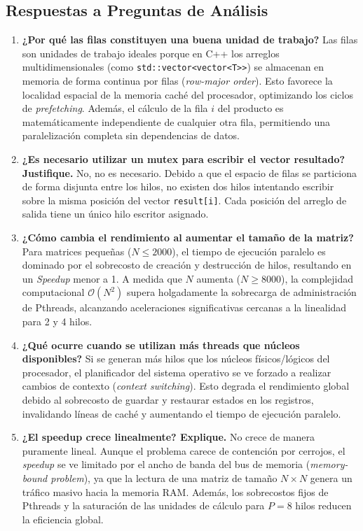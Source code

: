 \documentclass[11pt,a4paper]{article}
\begin{document}
\subsection{Respuestas a Preguntas de Análisis}
\begin{enumerate}
    \item \textbf{¿Por qué las filas constituyen una buena unidad de trabajo?}
    Las filas son unidades de trabajo ideales porque en C++ los arreglos multidimensionales (como \texttt{std::vector\textless{}vector\textless{}T\textgreater{}\textgreater{}}) se almacenan en memoria de forma continua por filas (\textit{row-major order}). Esto favorece la localidad espacial de la memoria caché del procesador, optimizando los ciclos de \textit{prefetching}. Además, el cálculo de la fila $i$ del producto es matemáticamente independiente de cualquier otra fila, permitiendo una paralelización completa sin dependencias de datos.

    \item \textbf{¿Es necesario utilizar un mutex para escribir el vector resultado? Justifique.}
    No, no es necesario. Debido a que el espacio de filas se particiona de forma disjunta entre los hilos, no existen dos hilos intentando escribir sobre la misma posición del vector \texttt{result[i]}. Cada posición del arreglo de salida tiene un único hilo escritor asignado.

    \item \textbf{¿Cómo cambia el rendimiento al aumentar el tamaño de la matriz?}
    Para matrices pequeñas ($N \le 2000$), el tiempo de ejecución paralelo es dominado por el sobrecosto de creación y destrucción de hilos, resultando en un \textit{Speedup} menor a 1. A medida que $N$ aumenta ($N \ge 8000$), la complejidad computacional $\mathcal{O}(N^2)$ supera holgadamente la sobrecarga de administración de Pthreads, alcanzando aceleraciones significativas cercanas a la linealidad para 2 y 4 hilos.

    \item \textbf{¿Qué ocurre cuando se utilizan más threads que núcleos disponibles?}
    Si se generan más hilos que los núcleos físicos/lógicos del procesador, el planificador del sistema operativo se ve forzado a realizar cambios de contexto (\textit{context switching}). Esto degrada el rendimiento global debido al sobrecosto de guardar y restaurar estados en los registros, invalidando líneas de caché y aumentando el tiempo de ejecución paralelo.

    \item \textbf{¿El speedup crece linealmente? Explique.}
    No crece de manera puramente lineal. Aunque el problema carece de contención por cerrojos, el \textit{speedup} se ve limitado por el ancho de banda del bus de memoria (\textit{memory-bound problem}), ya que la lectura de una matriz de tamaño $N \times N$ genera un tráfico masivo hacia la memoria RAM. Además, los sobrecostos fijos de Pthreads y la saturación de las unidades de cálculo para $P=8$ hilos reducen la eficiencia global.
\end{enumerate}
\end{document}
